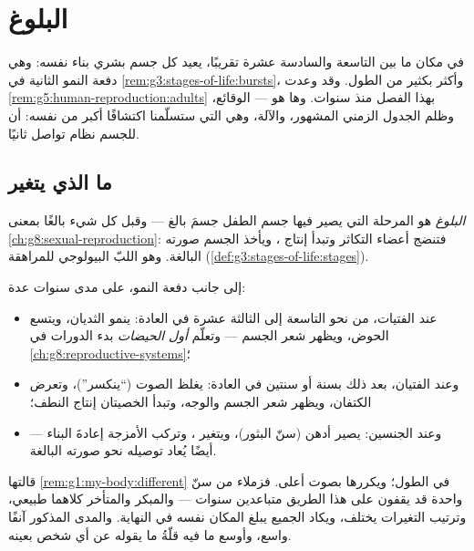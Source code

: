 \chapter{البلوغ}\label{ch:g8:puberty}

في مكان ما بين التاسعة والسادسة عشرة تقريبًا، يعيد كل جسم بشري بناء
نفسه: وهي دفعة النمو الثانية في
\cref{rem:g3:stages-of-life:bursts}، وأكثر بكثير من الطول. وقد
وعدت \cref{rem:g5:human-reproduction:adults} بهذا الفصل منذ
سنوات. وها هو --- الوقائع، وظلم الجدول الزمني المشهور، والآلة، وهي
التي ستسلّمنا اكتشافًا أكبر من  نفسه: أن للجسم نظام تواصل
ثانيًا.

\section{ما الذي يتغير}

\begin{definition}[البلوغ]\label{def:g8:puberty:puberty}
\emph{البلوغ} هو المرحلة التي يصير فيها جسم الطفل جسمَ
بالغ --- وقبل كل شيء بالغًا بمعنى
\cref{ch:g8:sexual-reproduction}: فتنضج أعضاء التكاثر وتبدأ إنتاج
\emph{}، ويأخذ الجسم صورته البالغة. وهو اللبّ البيولوجي
للمراهقة (\cref{def:g3:stages-of-life:stages}).
\end{definition}

\begin{proposition}\label{prop:g8:puberty:changes}
إلى جانب دفعة النمو، على مدى سنوات عدة:
\begin{itemize}
  \item عند الفتيات، من نحو التاسعة إلى الثالثة عشرة في العادة:
        ينمو الثديان، ويتسع الحوض، ويظهر شعر الجسم --- وتعلّم
        \emph{أول الحيضات} بدء الدورات في
        \cref{ch:g8:reproductive-systems}؛
  \item وعند الفتيان، بعد ذلك بسنة أو سنتين في العادة: يغلظ الصوت
        (``ينكسر'')، وتعرض الكتفان، ويظهر شعر الجسم والوجه، وتبدأ
        الخصيتان إنتاج النطف؛
  \item وعند الجنسين: يصير  أدهن (سنّ البثور)، ويتغير ،
        وتركب الأمزجة إعادةَ البناء ---  أيضًا يُعاد توصيله
        نحو صورته البالغة.
\end{itemize}
\end{proposition}
\admitted

\begin{remark}\label{rem:g8:puberty:timetable}
قالتها \cref{rem:g1:my-body:different} في الطول؛ ويكررها 
بصوت أعلى. فزملاء من سنّ واحدة قد يقفون على هذا الطريق متباعدين
سنوات --- والمبكر والمتأخر كلاهما طبيعي، وترتيب التغيرات يختلف،
ويكاد الجميع يبلغ المكان نفسه في النهاية. والمدى المذكور آنفًا
واسع، وأوسع ما فيه قلّةُ ما يقوله عن أي شخص بعينه.
\end{remark}

